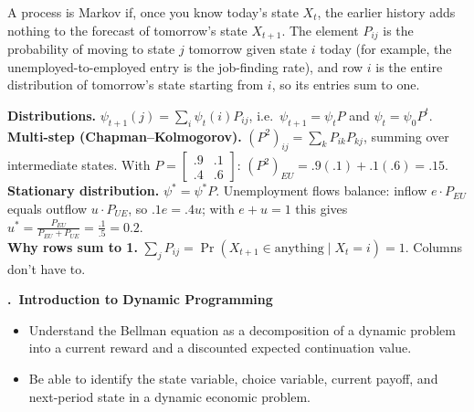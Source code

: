 \documentclass[11pt]{article}
\newcounter{qn}
\newcommand{\question}[1]{\par\needspace{14\baselineskip}\refstepcounter{qn}\medskip
{\bfseries\color{ink}\large \theqn.\ #1}\par\smallskip}
\begin{document}
\begin{resp}
\begin{minipage}[t]{0.64\textwidth}\vspace{0pt}
A process is Markov if, once you know today's state $X_t$, the earlier history adds nothing to the forecast of tomorrow's state $X_{t+1}$. The element $P_{ij}$ is the probability of moving to state $j$ tomorrow given state $i$ today (for example, the unemployed-to-employed entry is the job-finding rate), and row $i$ is the entire distribution of tomorrow's state starting from $i$, so its entries sum to one.
\end{minipage}\hfill
\begin{minipage}[t]{0.32\textwidth}\vspace{4pt}\centering
\scalebox{0.75}{\figMarkov}
\end{minipage}
\end{resp}
\begin{intu}
\textbf{Distributions.} $\psi_{t+1}(j)=\sum_i\psi_t(i)P_{ij}$, i.e.\ $\psi_{t+1}=\psi_tP$ and $\psi_t=\psi_0P^t$.\\
\textbf{Multi-step (Chapman--Kolmogorov).} $(P^2)_{ij}=\sum_kP_{ik}P_{kj}$, summing over intermediate states. With $P=\begin{bmatrix}.9&.1\\.4&.6\end{bmatrix}$: $(P^2)_{EU}=.9(.1)+.1(.6)=.15$.\\
\textbf{Stationary distribution.} $\psi^*=\psi^*P$. Unemployment flows balance: inflow $e\cdot P_{EU}$ equals outflow $u\cdot P_{UE}$, so $.1e=.4u$; with $e+u=1$ this gives $u^*=\frac{P_{EU}}{P_{EU}+P_{UE}}=\frac{.1}{.5}=0.2$.\\
\textbf{Why rows sum to 1.} $\sum_jP_{ij}=\Pr(X_{t+1}\in\text{anything}\mid X_t=i)=1$. Columns don't have to.
\end{intu}

\question{Introduction to Dynamic Programming}
\begin{itemize}[leftmargin=1.2em,itemsep=0pt]\itshape
\item Understand the Bellman equation as a decomposition of a dynamic problem into a current reward and a discounted expected continuation value.
\item Be able to identify the state variable, choice variable, current payoff, and next-period state in a dynamic economic problem.
\end{itemize}
\end{document}
